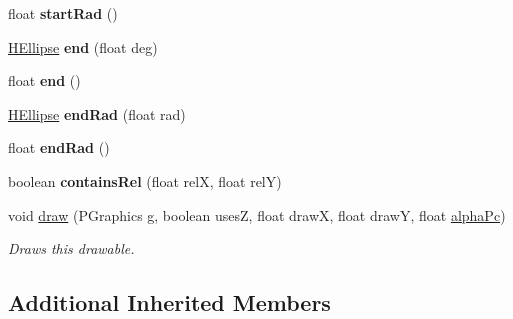 \begin{DoxyCompactItemize}
\item 
\hypertarget{classhype_1_1extended_1_1drawable_1_1_h_ellipse_af8b4b0f3b999612a79f5a093b15c286e}{float {\bfseries start\-Rad} ()}\label{classhype_1_1extended_1_1drawable_1_1_h_ellipse_af8b4b0f3b999612a79f5a093b15c286e}

\item 
\hypertarget{classhype_1_1extended_1_1drawable_1_1_h_ellipse_a8a5b8ff30e6c85dcbfb563e93074bdfd}{\hyperlink{classhype_1_1extended_1_1drawable_1_1_h_ellipse}{H\-Ellipse} {\bfseries end} (float deg)}\label{classhype_1_1extended_1_1drawable_1_1_h_ellipse_a8a5b8ff30e6c85dcbfb563e93074bdfd}

\item 
\hypertarget{classhype_1_1extended_1_1drawable_1_1_h_ellipse_a091f43be1c14502912457a911c72d132}{float {\bfseries end} ()}\label{classhype_1_1extended_1_1drawable_1_1_h_ellipse_a091f43be1c14502912457a911c72d132}

\item 
\hypertarget{classhype_1_1extended_1_1drawable_1_1_h_ellipse_a0c793a1889a7dd8f74b2288aaf9dc34e}{\hyperlink{classhype_1_1extended_1_1drawable_1_1_h_ellipse}{H\-Ellipse} {\bfseries end\-Rad} (float rad)}\label{classhype_1_1extended_1_1drawable_1_1_h_ellipse_a0c793a1889a7dd8f74b2288aaf9dc34e}

\item 
\hypertarget{classhype_1_1extended_1_1drawable_1_1_h_ellipse_aed99e6cb6f4c3e73f13e47cc7611cd80}{float {\bfseries end\-Rad} ()}\label{classhype_1_1extended_1_1drawable_1_1_h_ellipse_aed99e6cb6f4c3e73f13e47cc7611cd80}

\item 
\hypertarget{classhype_1_1extended_1_1drawable_1_1_h_ellipse_a07ac294be42ea5318fe9a61aef32c274}{boolean {\bfseries contains\-Rel} (float rel\-X, float rel\-Y)}\label{classhype_1_1extended_1_1drawable_1_1_h_ellipse_a07ac294be42ea5318fe9a61aef32c274}

\item 
void \hyperlink{classhype_1_1extended_1_1drawable_1_1_h_ellipse_a3cd6745167cc6678e4625a7a7f226023}{draw} (P\-Graphics g, boolean uses\-Z, float draw\-X, float draw\-Y, float \hyperlink{classhype_1_1core_1_1drawable_1_1_h_drawable_ad4f0e4c9f93d810c66b39f1715625719}{alpha\-Pc})
\begin{DoxyCompactList}\small\item\em Draws this drawable. \end{DoxyCompactList}\end{DoxyCompactItemize}
\subsection*{Additional Inherited Members}


